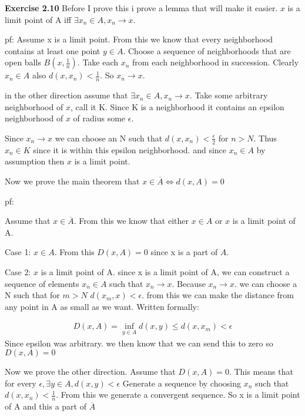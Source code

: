 \documentclass[12pt]{article}
\newenvironment{exercise}[1]{\vspace{.1in}\noindent\textbf{Exercise #1 \hspace{.05em}}}{}
\begin{document}
\begin{exercise}{2.10}
	Before I prove this i prove a lemma that will make it easier. $x$ is a limit point of A iff $\exists x_n\in A, x_n\rightarrow x$.

	pf: Assume x is a limit point. From this we know that every neighborhood contains at least one point $y\in A$. Choose a sequence of neighborhoods that are open balls $B(x,\frac{1}{n})$. Take each $x_n$ from each neighborhood in succession. Clearly $x_n\in A$ also $d(x,x_n)<\frac{1}{n}$. So $x_n\rightarrow x$.

	in the other direction assume that $\exists x_n\in A,x_n\rightarrow x$. Take some arbitrary neighborhood of $x$, call it K. Since K is a neighborhood it contains an epsilon neighborhood of $x$ of radius some $\epsilon$.

	Since $x_n\rightarrow x$ we can choose an N such that $d(x,x_n)<\frac{\epsilon}{2}$ for $n>N$. Thus $x_n\in K$ since it is within this epsilon neighborhood. and since $x_n\in A$ by assumption then $x$ is a limit point.

	Now we prove the main theorem that $x\in \overline{A}\iff d(x,A)=0$

	pf:

	Assume that $x\in \overline{A}$. From this we know that either $x\in A$ or $x$ is a limit point of A.

	Case 1: $x\in A$. From this $D(x,A)=0$ since x is a part of $A$.

	Case 2: $x$ is a limit point of A. since x is a limit point of A, we can construct a sequence of elements $x_n\in A$ such that $x_n\rightarrow x$. Because $x_n\rightarrow x$. we can choose a N such that for $m>N$ $d(x_m,x)<\epsilon$. from this we can make the distance from any point in A as small as we want. Written formally:

	\begin{align}
		D(x,A)=\inf_{y\in A}d(x,y)\leq d(x,x_m)<\epsilon
	\end{align}
	Since epsilon was arbitrary. we then know that we can send this to zero so $D(x,A)=0$


	Now we prove the other direction. Assume that $D(x,A)=0$. This means that for every $\epsilon, \exists y\in A, d(x,y)<\epsilon$  Generate a sequence by choosing $x_n$ such that $d(x,x_n)< \frac{1}{n}$. From this we generate a convergent sequence. So x is a limit point of A and this a part of $\overline{A}$
\end{exercise}
\end{document}
